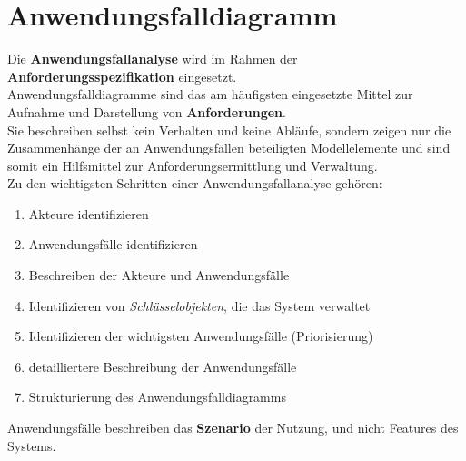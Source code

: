 \section{Anwendungsfalldiagramm}

\begin{tcolorbox}[title=Anwendungsfalldiagramm]
    Die \textbf{Anwendungsfallanalyse} wird im Rahmen der \textbf{Anforderungsspezifikation} eingesetzt.\\

    \noindent
    Anwendungsfalldiagramme sind das am häufigsten eingesetzte Mittel zur Aufnahme und Darstellung von \textbf{Anforderungen}.\\
    Sie beschreiben selbst kein Verhalten und keine Abläufe, sondern zeigen nur die Zusammenhänge der an Anwendungsfällen beteiligten Modellelemente und sind somit ein Hilfsmittel zur Anforderungsermittlung und Verwaltung.\\

    \noindent
    Zu den wichtigsten Schritten einer Anwendungsfallanalyse gehören:
    \begin{enumerate}
        \item Akteure identifizieren
        \item Anwendungsfälle identifizieren
        \item Beschreiben der Akteure und Anwendungsfälle
        \item Identifizieren von \textit{Schlüsselobjekten}, die das System verwaltet
        \item Identifizieren der wichtigsten Anwendungsfälle (Priorisierung)
        \item detailliertere Beschreibung der Anwendungsfälle
        \item Strukturierung des Anwendungsfalldiagramms
    \end{enumerate}

    \noindent
    Anwendungsfälle beschreiben das \textbf{Szenario} der Nutzung, und nicht Features des Systems.
\end{tcolorbox}
